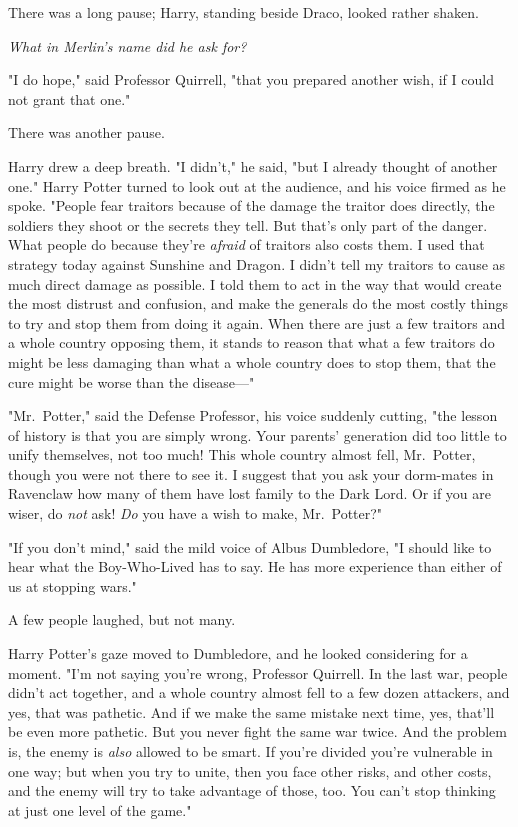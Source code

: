 There was a long pause; Harry, standing beside Draco, looked rather shaken.

\emph{What in Merlin's name did he ask for?}

"I do hope," said Professor Quirrell, "that you prepared another wish, if I
could not grant that one."

There was another pause.

Harry drew a deep breath. "I didn't," he said, "but I already thought of
another one." Harry Potter turned to look out at the audience, and his voice
firmed as he spoke. "People fear traitors because of the damage the traitor
does directly, the soldiers they shoot or the secrets they tell. But that's
only part of the danger. What people do because they're \emph{afraid} of
traitors also costs them. I used that strategy today against Sunshine and
Dragon. I didn't tell my traitors to cause as much direct damage as possible. I
told them to act in the way that would create the most distrust and confusion,
and make the generals do the most costly things to try and stop them from doing
it again. When there are just a few traitors and a whole country opposing them,
it stands to reason that what a few traitors do might be less damaging than
what a whole country does to stop them, that the cure might be worse than the
disease\mbox{---}"

"Mr.~Potter," said the Defense Professor, his voice suddenly cutting, "the
lesson of history is that you are simply wrong. Your parents' generation did
too little to unify themselves, not too much! This whole country almost fell,
Mr.~Potter, though you were not there to see it. I suggest that you ask your
dorm-mates in Ravenclaw how many of them have lost family to the Dark Lord. Or
if you are wiser, do \emph{not} ask! \emph{Do} you have a wish to make,
Mr.~Potter?"

"If you don't mind," said the mild voice of Albus Dumbledore, "I should like to
hear what the Boy-Who-Lived has to say. He has more experience than either of
us at stopping wars."

A few people laughed, but not many.

Harry Potter's gaze moved to Dumbledore, and he looked considering for a
moment. "I'm not saying you're wrong, Professor Quirrell. In the last war,
people didn't act together, and a whole country almost fell to a few dozen
attackers, and yes, that was pathetic. And if we make the same mistake next
time, yes, that'll be even more pathetic. But you never fight the same war
twice. And the problem is, the enemy is \emph{also} allowed to be smart. If
you're divided you're vulnerable in one way; but when you try to unite, then
you face other risks, and other costs, and the enemy will try to take advantage
of those, too. You can't stop thinking at just one level of the game."

